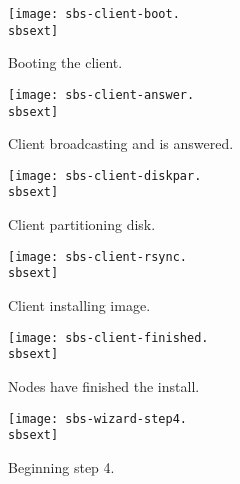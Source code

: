 \clearpage
\setlength{\oddsidemargin}{-0.5in}
\setlength{\evensidemargin}{-0.5in}
\setlength{\textwidth}{7.5in}

\begin{figure}[htbp]
  \begin{center}
    \texttt{[image: sbs-client-boot.\\sbsext]}
    \caption{Booting the client.}
    \label{fig:sbs-install-boot}
  \end{center}
\end{figure}

\begin{figure}[htbp]
  \begin{center}
    \texttt{[image: sbs-client-answer.\\sbsext]}
    \caption{Client broadcasting and is answered.}
    \label{fig:sbs-install-broadcast}
  \end{center}
\end{figure}

\begin{figure}[htbp]
  \begin{center}
    \texttt{[image: sbs-client-diskpar.\\sbsext]}
    \caption{Client partitioning disk.}
    \label{fig:sbs-install-diskpar}
  \end{center}
\end{figure}

\begin{figure}[htbp]
  \begin{center}
    \texttt{[image: sbs-client-rsync.\\sbsext]}
    \caption{Client installing image.}
    \label{fig:sbs-install-rsync}
  \end{center}
\end{figure}

\begin{figure}[htbp]
  \begin{center}
    \texttt{[image: sbs-client-finished.\\sbsext]}
    \caption{Nodes have finished the install.}
    \label{fig:sbs-install-finish}
  \end{center}
\end{figure}

\begin{figure}[htbp]
  \begin{center}
    \texttt{[image: sbs-wizard-step4.\\sbsext]}
    \caption{Beginning step 4.}
    \label{fig:sbs-install-wizard-s4}
  \end{center}
\end{figure}


